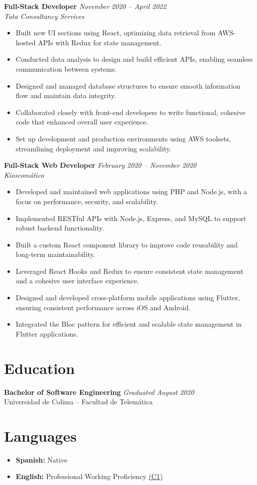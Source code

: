 \documentclass[10pt,letterpaper]{article}
\begin{document}
\vspace{1pt}
\textbf{Full-Stack Developer} \hfill \textit{November 2020 -- April 2022}\\
\textit{Tata Consultancy Services}
\begin{itemize}
    \item Built new UI sections using React, optimizing data retrieval from AWS-hosted APIs with Redux for state management.
    \item Conducted data analysis to design and build efficient APIs, enabling seamless communication between systems.
    \item Designed and managed database structures to ensure smooth information flow and maintain data integrity.
    \item Collaborated closely with front-end developers to write functional, cohesive code that enhanced overall user experience.
    \item Set up development and production environments using AWS toolsets, streamlining deployment and improving scalability.
\end{itemize}

\vspace{1pt}
\textbf{Full-Stack Web Developer} \hfill \textit{February 2020 -- November 2020}\\
\textit{Kioscomático}
\begin{itemize}
    \item Developed and maintained web applications using PHP and Node.js, with a focus on performance, security, and scalability.
    \item Implemented RESTful APIs with Node.js, Express, and MySQL to support robust backend functionality.
    \item Built a custom React component library to improve code reusability and long-term maintainability.
    \item Leveraged React Hooks and Redux to ensure consistent state management and a cohesive user interface experience.
    \item Designed and developed cross-platform mobile applications using Flutter, ensuring consistent performance across iOS and Android.
    \item Integrated the Bloc pattern for efficient and scalable state management in Flutter applications.
\end{itemize}

\section*{Education}
\textbf{Bachelor of Software Engineering} \hfill \textit{Graduated August 2020}\\
Universidad de Colima -- Facultad de Telemática

\section*{Languages}
\begin{itemize}
    \item \textbf{Spanish:} Native
    \item \textbf{English:} Professional Working Proficiency \href{https://cert.efset.org/en/SdWPH8}{(C1)}
\end{itemize}
\end{document}
